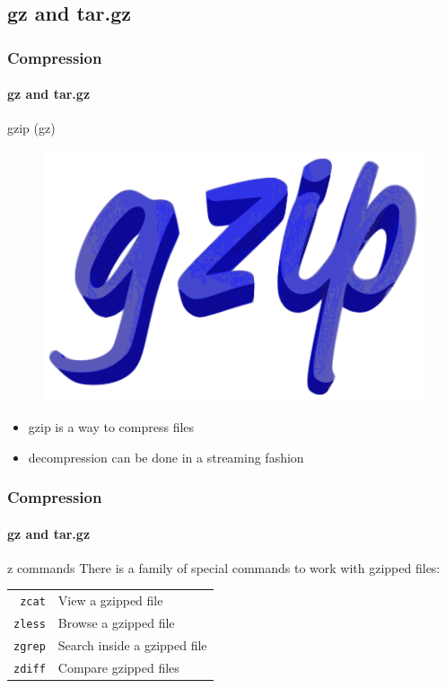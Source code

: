 \documentclass[aspectratio=169,usenames,dvipsnames]{beamer}
\begin{document}
    \subsection{gz and tar.gz}
    \begin{frame}
        \frametitle{Compression}
        \framesubtitle{gz and tar.gz}
        \begin{block}{gzip (gz)}
        \begin{figure}
        \centering
        \vspace{-6pt}
        \includegraphics[width=0.8\linewidth]{Figures/gzip.png}
        \end{figure}
            \mbox{}

        \begin{itemize}
            \item gzip is a way to compress files
            \item decompression can be done in a streaming fashion
        \end{itemize}
        \end{block}
    \end{frame}

    \begin{frame}
        \frametitle{Compression}
        \framesubtitle{gz and tar.gz}
        \begin{block}{z commands}
            There is a family of special commands to work with gzipped files:
            
            \begin{center}
            \begin{tabular}{rl}
                \texttt{zcat} & View a gzipped file \\
                \texttt{zless} & Browse a gzipped file \\
                \texttt{zgrep} & Search inside a gzipped file \\
                \texttt{zdiff} & Compare gzipped files \\
            \end{tabular}
            \end{center}
        \end{block}
    \end{frame}
\end{document}
